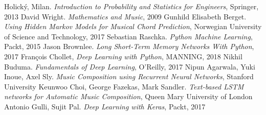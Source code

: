 \documentclass[]{book}
\theoremstyle{definition}
\begin{document}
\begin{thebibliography}{9}
	Holický, Milan. \textit{Introduction to Probability and Statistics for Engineers}, Springer, 2013
	David Wright. \textit{Mathematics and Music}, 2009
	Gunhild Elisabeth Berget. \textit{Using Hidden Markov Models for Musical Chord Prediction}, Norwegian University of Science and Technology, 2017
	Sebastian Raschka.\textit{ Python Machine Learning}, Packt, 2015
	Jason Brownlee. \textit{Long Short-Term Memory Networks With Python}, 2017
	François Chollet, \textit{Deep Learning with Python}, MANNING, 2018
	Nikhil Buduma. \textit{Fundamentals of Deep Learning}, O'Reilly, 2017
	Nipun Agarwala, Yuki Inoue, Axel Sly. \textit{Music Composition using Recurrent Neural Networks}, Stanford University
	Keunwoo Choi, George Fazekas, Mark Sandler. \textit{Text-based LSTM networks for Automatic Music Composition}, Queen Mary University of London
	Antonio Gulli, Sujit Pal. \textit{Deep Learning with Keras}, Packt, 2017
	
\end{thebibliography}

\printnotes*
\end{document}
